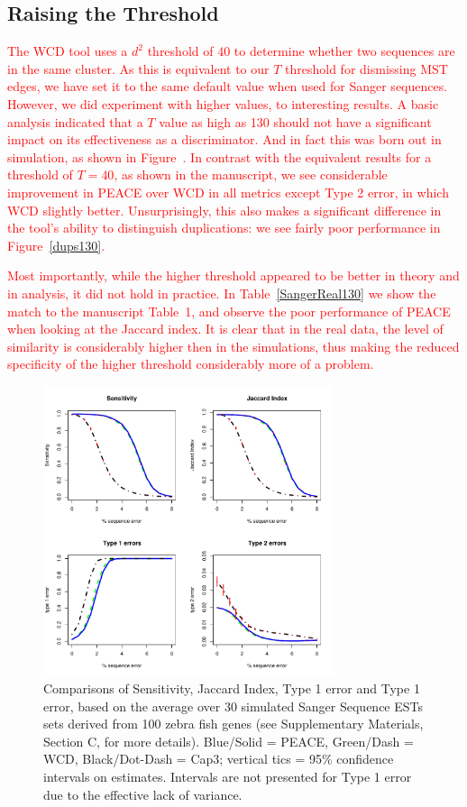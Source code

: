 \documentclass[a4paper,12pt]{article}
\newcommand{\mc}[1]{\textcolor{red}{#1}}
\newcommand{\peace} {{\small PEACE}}
\newcommand{\wcd} {{\small WCD}}
\newcommand{\capthree} {{\small Cap3}}
\begin{document}
\begin{appendix}
\subsection{Raising the Threshold}
\label{sim_thresh}
\mc{ 
  The \wcd\/ tool uses a $d^2$ threshold of $40$ to determine whether
  two sequences are in the same cluster.  As this is equivalent to our
  $T$ threshold for dismissing MST edges, we have set it to the same
  default value when used for Sanger sequences.  However, we did
  experiment with higher values, to interesting results.  A basic
  analysis indicated that a $T$ value as high as 130 should not have a
  significant impact on its effectiveness as a discriminator.  And in
  fact this was born out in simulation, as shown in
  Figure~\label{SiJiT1T2130}.  In contrast with the equivalent results
  for a threshold of $T=40$, as shown in the manuscript, we see
  considerable improvement in \peace\/ over \wcd\/ in all metrics
  except Type 2 error, in which \wcd\/ slightly
  better. Unsurprisingly, this also makes a significant difference in
  the tool's ability to distinguish duplications: we see fairly poor
  performance in Figure~\ref{dups130}.  
}

\mc{
  Most importantly, while the higher threshold appeared to be better
  in theory and in analysis, it did not hold in practice.  In
  Table~\ref{SangerReal130} we show the match to the manuscript
  Table~1, and observe the poor performance of
  \peace\/ when looking at the Jaccard index.  It is clear that in the
  real data, the level of similarity is considerably higher then in the
  simulations, thus making the reduced specificity of the higher
  threshold considerably more of a problem.
}


\begin{figure}
  \centerline{\includegraphics[width=3.35in]{pics.d/SeJiT1T2x40.pdf}}
  \caption{Comparisons of Sensitivity, Jaccard Index, Type 1 error and
    Type 1 error, based on the
    average over 30 simulated Sanger Sequence ESTs sets derived from 100 zebra
    fish genes  (see
    Supplementary Materials, Section C, for more details).  Blue/Solid
    = \peace, Green/Dash = \wcd, Black/Dot-Dash = \capthree; vertical
    tics = 95\% confidence intervals on estimates.  Intervals are not
    presented for Type 1 error due to the effective lack of
    variance.}\label{SeJiT1T2130}
\end{figure}


\end{appendix}
\end{document}
